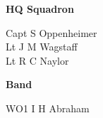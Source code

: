 \begin{center}
  \Large
  \textbf{HQ Squadron}
\end{center}

\begin{multicols}{2}
  \noindent
  Capt S Oppenheimer \\
  Lt J M Wagstaff \\
  Lt R C Naylor \\
\end{multicols}

\begin{center}
  \Large
  \textbf{Band}
\end{center}

\begin{multicols}{2}
  \noindent
  WO1 I H Abraham \\
\end{multicols}

